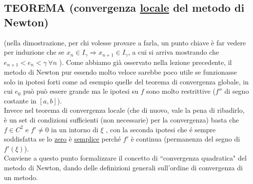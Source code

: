 \documentclass[12pt]{article}
\DeclarePairedDelimiter{\abs}{\lvert}{\rvert}
\begin{document}
\subsection{TEOREMA (convergenza \uline{locale} del metodo di Newton)}
\begin{center}
\end{center}
(nella dimostrazione, per chi volesse provare a farla, un punto chiave è far vedere per induzione che se $x_n \in I_\gamma \Rightarrow x_{n+1}\in I_\gamma$, a cui si arriva mostrando che  $e_{n+1}<e_n<\gamma \ \forall n$ ).
\newline \newline
Come abbiamo già osservato nella lezione precedente, il metodo di Newton pur essendo molto veloce sarebbe poco utile se funzionasse solo in ipotesi forti come ad esempio quelle del teorema di convergenza globale, in cui $e_0$ può può essere grande ma le ipotesi su $f$ sono molto restrittive ($f''$ di segno costante in $[a,b]$).\\
Invece nel teorema di convergenza locale  (che di nuovo, vale la pena di ribadirlo, è un set di condizioni sufficienti (non necessarie) per la convergenza) basta che $ f\in C^2$  e  $ f'\neq 0 $ in un intorno di  $ \xi $ , con la seconda ipotesi che é sempre soddisfatta se lo \uline{zero} è \uline{semplice} perché $f'$ è continua (permanenza del segno di $f'(\xi)$).\\
Conviene a questo punto formalizzare il concetto di ``convergenza quadratica" del metodo di Newton, dando delle definizioni generali sull'ordine di convergenza di un metodo. 
\end{document}
